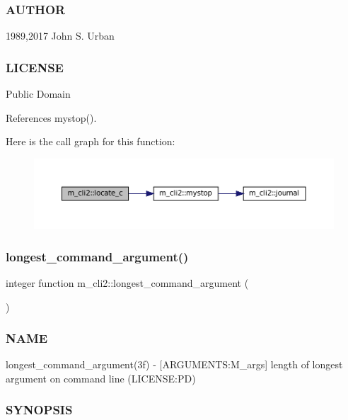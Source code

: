 \subsubsection*{A\+U\+T\+H\+OR}

1989,2017 John S. Urban \subsubsection*{L\+I\+C\+E\+N\+SE}

Public Domain 

References mystop().

Here is the call graph for this function\+:
\nopagebreak
\begin{figure}[H]
\begin{center}
\leavevmode
\includegraphics[width=350pt]{namespacem__cli2_a2199778fea512efcde8778f20765643a_cgraph}
\end{center}
\end{figure}
\mbox{\label{namespacem__cli2_a7240f12031027172b87fde623bd77958}} 
\subsubsection{\texorpdfstring{longest\+\_\+command\+\_\+argument()}{longest\_command\_argument()}}
{\footnotesize\ttfamily integer function m\+\_\+cli2\+::longest\+\_\+command\+\_\+argument (\begin{DoxyParamCaption}{ }\end{DoxyParamCaption})\hspace{0.3cm}{\ttfamily [private]}}



\subsubsection*{N\+A\+ME}

longest\+\_\+command\+\_\+argument(3f) -\/ \mbox{[}A\+R\+G\+U\+M\+E\+N\+TS\+:M\+\_\+args\mbox{]} length of longest argument on command line (L\+I\+C\+E\+N\+SE\+:PD) \subsubsection*{S\+Y\+N\+O\+P\+S\+IS}

